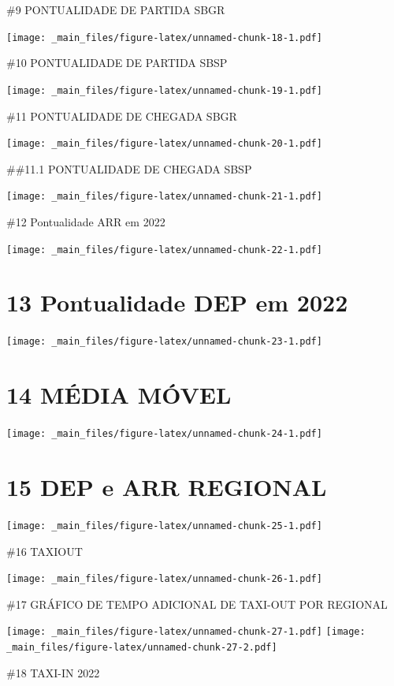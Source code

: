 \documentclass[
]{book}
\theoremstyle{definition}
\theoremstyle{definition}
\theoremstyle{definition}
\theoremstyle{definition}
\theoremstyle{remark}
\begin{document}
\#9 PONTUALIDADE DE PARTIDA SBGR

\texttt{[image: \_main\_files/figure-latex/unnamed-chunk-18-1.pdf]}

\#10 PONTUALIDADE DE PARTIDA SBSP

\texttt{[image: \_main\_files/figure-latex/unnamed-chunk-19-1.pdf]}

\#11 PONTUALIDADE DE CHEGADA SBGR

\texttt{[image: \_main\_files/figure-latex/unnamed-chunk-20-1.pdf]}

\#\#11.1 PONTUALIDADE DE CHEGADA SBSP

\texttt{[image: \_main\_files/figure-latex/unnamed-chunk-21-1.pdf]}

\#12 Pontualidade ARR em 2022

\texttt{[image: \_main\_files/figure-latex/unnamed-chunk-22-1.pdf]}

\hypertarget{pontualidade-dep-em-2022}{%
\chapter{13 Pontualidade DEP em 2022}\label{pontualidade-dep-em-2022}}

\texttt{[image: \_main\_files/figure-latex/unnamed-chunk-23-1.pdf]}

\hypertarget{muxe9dia-muxf3vel}{%
\chapter{14 MÉDIA MÓVEL}\label{muxe9dia-muxf3vel}}

\texttt{[image: \_main\_files/figure-latex/unnamed-chunk-24-1.pdf]}

\hypertarget{dep-e-arr-regional}{%
\chapter{15 DEP e ARR REGIONAL}\label{dep-e-arr-regional}}

\texttt{[image: \_main\_files/figure-latex/unnamed-chunk-25-1.pdf]}

\#16 TAXIOUT

\texttt{[image: \_main\_files/figure-latex/unnamed-chunk-26-1.pdf]}

\#17 GRÁFICO DE TEMPO ADICIONAL DE TAXI-OUT POR REGIONAL

\texttt{[image: \_main\_files/figure-latex/unnamed-chunk-27-1.pdf]} \texttt{[image: \_main\_files/figure-latex/unnamed-chunk-27-2.pdf]}

\#18 TAXI-IN 2022
\end{document}
